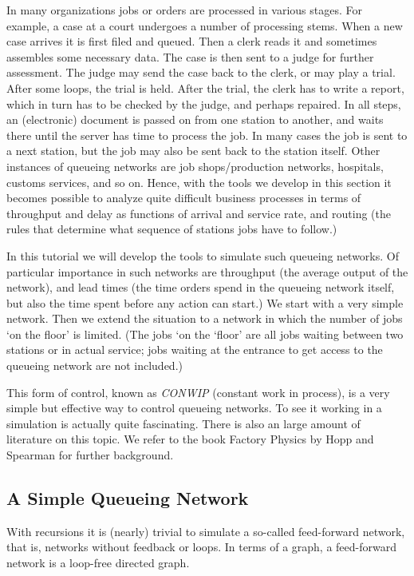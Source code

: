In many organizations jobs or orders are processed in various stages.
For example, a case at a court undergoes a number of processing stems.
When a new case arrives it is first filed and queued.
Then a clerk reads it and sometimes assembles some necessary data.
The case is then sent to a judge for further assessment.
The judge may send the case back to the clerk, or may play a trial.
After some loops, the trial is held.
After the trial, the clerk has to write a report, which in turn has to be checked by the judge, and perhaps repaired.
In all steps, an (electronic) document is passed on from one station to another, and waits there until the server has time to process the job.
In many cases the job is sent to a next station, but the job may also be sent back to the station itself.
Other instances of queueing networks are job shops/production networks, hospitals, customs services, and so on.
Hence, with the tools we develop in this section it becomes possible to analyze quite difficult business processes in terms of throughput and delay as functions of arrival and service rate, and routing (the rules that determine what sequence of stations jobs have to follow.)

In this tutorial we will develop the tools to simulate such queueing networks. Of particular importance in such networks are throughput (the average output of the network), and lead times (the time orders spend in the queueing network itself, but also the time spent before any action can start.) We start with a very simple network. Then we extend the situation to a network in which the number of jobs `on the floor' is limited. (The jobs `on the `floor' are all jobs waiting between two stations or in actual service; jobs waiting at the entrance to get access to the queueing network are not included.) 

This form of control, known as \emph{CONWIP} (constant work in process), is a very simple but effective way to control queueing networks. To see it working in a simulation is actually quite fascinating. There is also an large amount of literature on this topic. We refer to the book Factory Physics by Hopp and Spearman for further background. 


\subsection{A Simple Queueing Network}


With recursions it is (nearly) trivial to simulate a so-called feed-forward network, that is, networks without feedback or loops.  In terms of a graph, a feed-forward network is a loop-free directed graph. 

